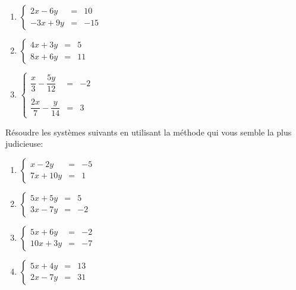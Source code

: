 \begin{exercice}
\begin{exercice}
\begin{exercice}
\begin{enumerate}
\item $\left\lbrace\begin{array}{lll}
 2x-6y&=&10 \\
 -3x+9y&=&-15
\end{array}\right.$

\item $\left\lbrace\begin{array}{lll}
4x+3y&=& 5\\
8x+6y&=& 11
\end{array}\right.$

 \item $\left\lbrace\begin{array}{lll}
\dfrac{x}{3}-\dfrac{5y}{12}&=& -2\\\\
\dfrac{2x}{7}-\dfrac{y}{14}&=& 3
\end{array}\right.$

\end{enumerate}
\end{exercice}

\begin{exercice}
Résoudre les systèmes suivants en utilisant la méthode qui vous semble la plus judicieuse:

\begin{enumerate}
 \item $\left\lbrace\begin{array}{lll}
x-2y&=& -5\\
7x+10y&=& 1
\end{array}\right.$

\item $\left\lbrace\begin{array}{lll}
 5x+5y&=&5 \\
 3x-7y&=&-2
\end{array}\right.$

\item $\left\lbrace\begin{array}{lll}
 5x+6y&=&-2 \\
 10x+3y&=&-7
\end{array}\right.$

\item $\left\lbrace\begin{array}{lll}
 5x+4y&=&13 \\
 2x-7y&=&31
\end{array}\right.$

\end{enumerate}
\end{exercice}


\end{exercice}
\end{exercice}
